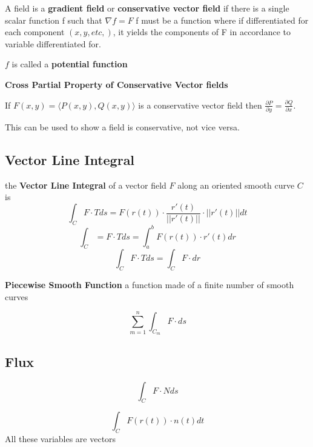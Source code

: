 A field is a \textbf{gradient field} or \textbf{conservative vector field} if there is a single scalar function f such that $\nabla f=F$ f must be a function where if differentiated for each component $(x,y,etc,)$, it yields the components of F in accordance to variable differentiated for.

\hfill
\hfill

$f$ is called a \textbf{potential function}


\textbf{Cross Partial Property of Conservative Vector fields}

If $F(x,y)=\langle P(x,y),Q(x,y)\rangle$ is a conservative vector field then $\frac{\partial P}{\partial y}=\frac{\partial Q}{\partial x}$. 


\hfill

This can be used to show a field is conservative, not vice versa.


\subsection{Vector Line Integral}
the \textbf{Vector Line Integral} of a vector field $F$ along an oriented smooth curve $C$ is 
\begin{equation}
	\label{}
\int_{C}F \cdot T ds = F(r(t)) \cdot \frac{r'(t)}{||r'(t)||}\cdot ||r'(t)||dt
\end{equation}
\begin{equation}
	\label{}
	\int_{C}=F\cdot Tds = \int_{a}^{b}F(r(t))\cdot r'(t)dr
\end{equation}
\begin{equation}
	\label{}
\int_{C}F\cdot T ds = \int_{C}F\cdot dr	
\end{equation}

\textbf{Piecewise Smooth Function}
a function made of a finite number of smooth curves

\begin{equation}
	\label{}
\sum_{m=1}^{n}	\int_{C_{m}}F\cdot ds
\end{equation}


\subsection{Flux}
\begin{equation}
	\label{}
\int_{C}F\cdot N ds	
\end{equation}

\begin{equation}
	\label{}
\int_{C}F(r(t))\cdot n(t)dt	
\end{equation}
All these variables are vectors


